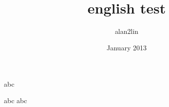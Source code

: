 \documentclass[a4paper,12pt]{book}
\begin{document}
\author{alan2lin}
\title{english test}
\date{January 2013}

\frontmatter
\maketitle
\tableofcontents

\mainmatter





abc


abc 
abc
\backmatter
\end{document}
